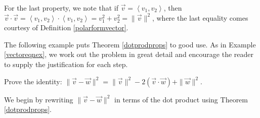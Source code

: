 \documentclass{ximera}
\begin{document}
For the last property, we note that if  $\overrightarrow{v} = \left<v_1,v_2\right>$, then $\overrightarrow{v} \cdot \overrightarrow{v} = \left<v_1,v_2\right> \cdot \left<v_1,v_2\right> = v_1^2 + v_2^2 = \|\overrightarrow{v}\|^2$, where the last equality comes courtesy of Definition \ref{polarformvector}.

 

The following example puts Theorem \ref{dotprodprops} to good use.  As in Example \ref{vectoreqnex}, we work out the problem in great detail and encourage the reader to supply the justification for each step.

\begin{example}  \label{dotprodpropex}  Prove the identity:  $\| \overrightarrow{v} - \overrightarrow{w} \|^2 =  \|\overrightarrow{v}\|^2  -2 (\overrightarrow{v}\cdot\overrightarrow{w}) + \|\overrightarrow{w}\|^2$.

\begin{explanation} 

We begin by rewriting  $\| \overrightarrow{v} - \overrightarrow{w} \|^2$ in terms of the dot product using Theorem \ref{dotprodprops}.

\[ \begin{array}{rcl}


\end{array}\]
\end{explanation}
\end{example}
\end{document}
